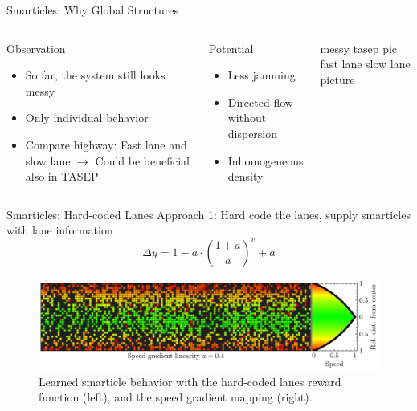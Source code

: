 \documentclass[10pt,xcolor=table, aspectratio=1610]{beamer}
\begin{document}
\begin{frame}{Smarticles: Why Global Structures}
  \begin{columns}
    \begin{block}{Observation}
      \begin{itemize}
        \item So far, the system still looks messy
        \item Only individual behavior
        \item Compare highway: Fast lane and slow lane
        $\rightarrow$ Could be beneficial also in TASEP 
      \end{itemize}
    \end{block}
    \begin{block}{Potential}
      \begin{itemize}
        \item Less jamming
        \item Directed flow without dispersion
        \item Inhomogeneous density
      \end{itemize}
    \end{block}
    messy tasep pic
    fast lane slow lane picture
  \end{columns}
\end{frame}

\begin{frame}{Smarticles: Hard-coded Lanes}
  Approach 1: Hard code the lanes, supply smarticles with lane information\\
  \begin{equation*}
    \Delta y = 1-a\cdot\left(\frac{1+a}{a}\right)^v+a
  \end{equation*}
  \begin{figure}
    \includegraphics[width=\textwidth]{../Thesis/img/results/speed_gradient_0.4.pdf}
    \caption*{Learned smarticle behavior with the hard-coded lanes reward function (left), and the speed gradient mapping (right).}
  \end{figure}
\end{frame}
\end{document}
